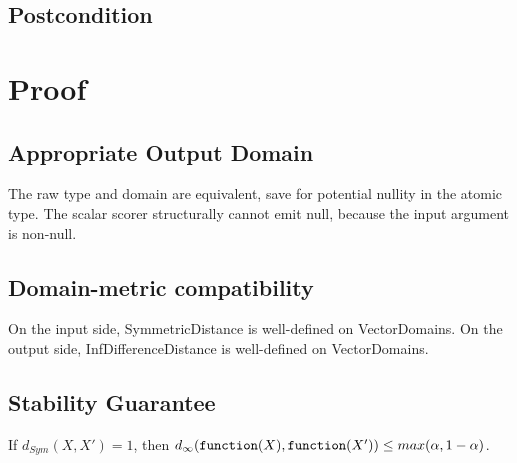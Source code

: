 \documentclass{article}
\begin{document}
\subsection*{Postcondition}

\section{Proof}
\subsection{Appropriate Output Domain}
\label{sec:approp-output-domain}
The raw type and domain are equivalent, save for potential nullity in the atomic type. 
The scalar scorer structurally cannot emit null, because the input argument is non-null.

\subsection{Domain-metric compatibility}
On the input side, SymmetricDistance is well-defined on VectorDomains. 
On the output side, InfDifferenceDistance is well-defined on VectorDomains.

\subsection{Stability Guarantee}

\begin{lemma}
    \label{single-change-stab}
    If $d_{Sym}(X, X') = 1$, then $d_\infty(\texttt{function}(X), \texttt{function}(X')) \le max(\alpha, 1 - \alpha)$.
\end{lemma}
\end{document}
